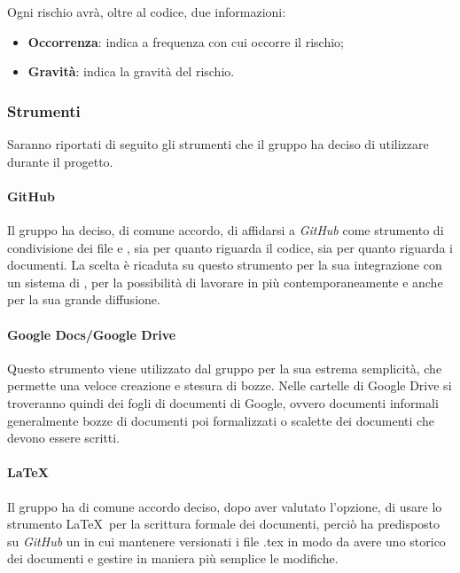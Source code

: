 Ogni rischio avrà, oltre al codice, due informazioni: 
\begin{itemize}
	\item \textbf{Occorrenza}: indica a frequenza con cui occorre il rischio;
	\item \textbf{Gravità}: indica la gravità del rischio.
\end{itemize}

\subsubsection{Strumenti}

Saranno riportati di seguito gli strumenti che il gruppo ha deciso di utilizzare durante il progetto.

\paragraph{GitHub}

Il gruppo ha deciso, di comune accordo, di affidarsi a \emph{GitHub} come strumento di condivisione dei file e 
, sia per quanto riguarda il codice, sia per quanto riguarda i documenti. La scelta è 
ricaduta su questo strumento per la sua integrazione con un sistema di , per la possibilità 
di lavorare in più  contemporaneamente e anche per la sua grande diffusione.

\paragraph{Google Docs/Google Drive}

Questo strumento viene utilizzato dal gruppo per la sua estrema semplicità, che permette una veloce creazione e stesura 
di bozze. Nelle cartelle di Google Drive si troveranno quindi dei fogli di documenti di Google, ovvero documenti 
informali generalmente bozze di documenti poi formalizzati o scalette dei documenti che devono essere scritti.

\paragraph{\LaTeX}

Il gruppo ha di comune accordo deciso, dopo aver valutato l'opzione, di usare lo strumento \LaTeX\ per la scrittura 
formale dei documenti, perciò ha predisposto su \emph{GitHub} un  in cui mantenere versionati i 
file .tex in modo da avere uno storico dei documenti e gestire in maniera più semplice le modifiche.

